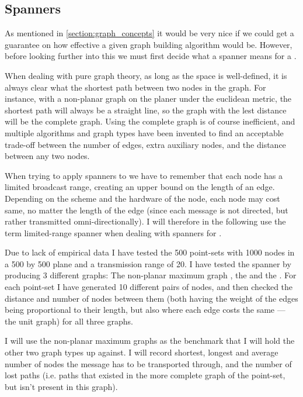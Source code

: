 \subsection{Spanners}
\label{section:spanners}
As mentioned in \ref{section:graph_concepts} it would be very nice if we could get a guarantee on how effective a given graph building algorithm would be. However, before looking further into this we must first decide what a spanner means for a \manet.

When dealing with pure graph theory, as long as the space is well-defined, it is always clear what the shortest path between two nodes in the graph. For instance, with a non-planar graph on the planer under the euclidean metric, the shortest path will always be a straight line, so the graph with the lest distance will be the complete graph. Using the complete graph is of course inefficient, and multiple algorithms and graph types have been invented to find an acceptable trade-off between the number of edges, extra auxiliary nodes, and the distance between any two nodes.

When trying to apply spanners to \manet we have to remember that each node has a limited broadcast range, creating an upper bound on the length of an edge. Depending on the scheme and the hardware of the node, each node may cost same, no matter the length of the edge (since each message is not directed, but rather transmitted omni-directionally). I will therefore in the following use the term limited-range spanner when dealing with spanners for \manet. 



Due to lack of empirical data I have tested the   500 point-sets with 1000 nodes in a 500 by 500 plane and a transmission range of 20. I have tested the spanner by producing 3 different graphs: The non-planar maximum graph , the \gabe and the \rng. For each point-set I have generated 10 different pairs of nodes, and then checked the distance and number of nodes between them (both having the weight of the edges being proportional to their length, but also where each edge costs the same --- the unit graph) for all three graphs. 

I will use the non-planar maximum graphs as the benchmark that I will hold the other two graph types up against. I will record shortest, longest and average number of nodes the message has to be transported through, and the number of lost paths (i.e. paths that existed in the more complete graph of the point-set, but isn't present in this graph). 

